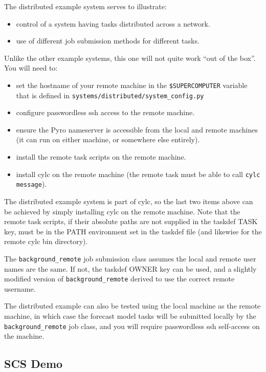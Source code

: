 \documentclass[11pt,a4paper]{article}
\begin{document}
The distributed example system serves to illustrate:

\begin{itemize}
    \item control of a system having tasks distributed across a network.
    \item use of different job submission methods for different tasks.
\end{itemize}

Unlike the other example systems, this one will not quite work ``out of
the box''. You will need to:

\begin{itemize}
    \item set the hostname of your remote machine in the
        \lstinline=$SUPERCOMPUTER= variable that is defined in 
        \lstinline=systems/distributed/system_config.py=
    \item configure passwordless ssh access to the remote machine.
    \item ensure the Pyro nameserver is accessible from the local and
        remote machines (it can run on either machine, or somewhere else
        entirely).
    \item install the remote task scripts on the remote machine.
    \item install cylc on the remote machine (the remote task must be
        able to call \lstinline=cylc message=).
\end{itemize}

The distributed example system is part of cylc, so the last two items above
can be achieved by simply installing cylc on the remote machine.  Note that
the remote task scripts, if their absolute paths are not supplied in the
taskdef TASK key, must be in the PATH environment set in the taskdef
file (and likewise for the remote cylc bin directory).

The \lstinline=background_remote= job submission class assumes the local
and remote user names are the same.  If not, the taskdef OWNER key can
be used, and a slightly modified version of
\lstinline=background_remote= derived to use the correct remote
username.

The distributed example can also be tested using the local machine as
the remote machine, in which case the forecast model tasks will be
submitted locally by the \lstinline=background_remote= job class, and
you will require passwordless ssh self-access on the machine.


\pagebreak
\subsection{SCS Demo}
\end{document}
